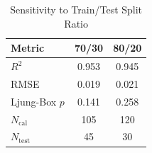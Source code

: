 \begin{table}[htbp]
\caption{Sensitivity to Train/Test Split Ratio}
\label{tab:sensitivity_split}
\centering
\begin{tabular}{lcc}
\toprule
\textbf{Metric} & 70/30 & 80/20 \\
\midrule
$R^2$ & 0.953 & 0.945 \\
RMSE & 0.019 & 0.021 \\
Ljung-Box $p$ & 0.141 & 0.258 \\
$N_{\mathrm{cal}}$ & 105 & 120 \\
$N_{\mathrm{test}}$ & 45 & 30 \\
\bottomrule
\end{tabular}
\end{table}